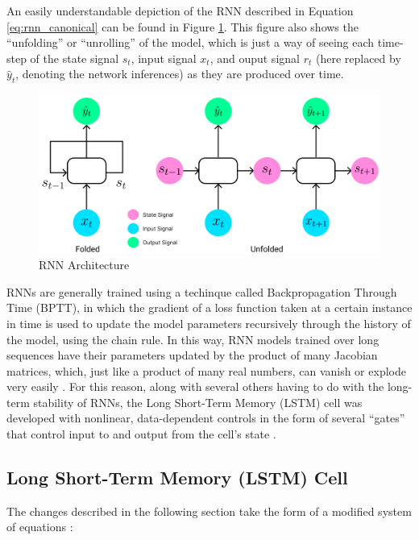 \documentclass{scrartcl}
\begin{document}
An easily understandable depiction of the RNN described in Equation
\ref{eq:rnn_canonical} can be found in Figure \ref{fig:rnn_arch}. This figure
also shows the ``unfolding'' or ``unrolling'' of the model, which is just a way
of seeing each time-step of the state signal $s_t$, input signal
$x_t$, and ouput signal $r_t$ (here replaced by $\hat{y}_t$,
denoting the network inferences) as they are produced over time.

\begin{figure}[H]
	\begin{center}
		\includegraphics[width=1\textwidth]{figures/rnn_arch.png}
	\end{center}
	\caption{RNN Architecture}
	\label{fig:rnn_arch}
\end{figure}

RNNs are generally trained using a techinque called Backpropagation Through
Time (BPTT), in which the gradient of a loss function taken at a certain
instance in time is used to update the model parameters recursively through the
history of the model, using the chain rule. In this way, RNN models trained
over long sequences have their parameters updated by the product of many
Jacobian matrices, which, just like a product of many real numbers, can vanish
or explode very easily \cite{rnn_training_challenges}. For this reason, along
with several others having to do with the long-term stability of RNNs, the Long
Short-Term Memory (LSTM) cell was developed with nonlinear, data-dependent
controls in the form of several ``gates'' that control input to and output from 
the cell's state \cite{rnn_and_lstm_fundamentals}.

\subsection{Long Short-Term Memory (LSTM) Cell}
\label{subsec:lstm}

The changes described in the following section take the form of a modified
system of equations \cite{rnn_review}: 
\end{document}
